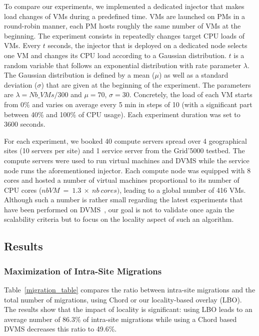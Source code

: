 To compare our experiments, we implemented a dedicated injector that makes load changes of
VMs during a predefined time. VMs are launched on PMs in a round-robin manner, \ie each
PM hosts roughly the same number of VMs at the beginning. The experiment consists in
repeatedly changes target CPU loads of VMs. Every $t$ seconds, the injector that is
deployed on a dedicated node selects one VM and changes its CPU load according to a
Gaussian distribution. $t$ is a random variable that follows an exponential distribution
with rate parameter $\lambda$. The Gaussian distribution is defined by a mean ($\mu$) as
well as a standard deviation ($\sigma$) that are given at the beginning of the experiment.
The parameters are $\lambda=\mathit{Nb\_VMs}/300$ and $\mu=70$, $\sigma=30$.
Concretely, the load of each VM starts from 0\% and varies on average every 5
min in steps of 10 (with a significant part between 40\% and 100\% of CPU
usage). Each experiment duration was set to 3600 seconds.

For each experiment, we booked 40 compute servers spread over 4 geographical sites (10
servers per site) and 1 service server from the Grid'5000 testbed. The compute servers
were used to run virtual machines and DVMS while the service node runs the aforementioned
injector.
%
Each compute node was equipped with 8 cores and hosted a number of virtual machines
proportional to its number of CPU cores ($nb VM\ =\ 1.3\ \times\ nb\ cores)$, leading to
a global number of 416 VMs. Although such a number is rather small regarding the latest
experiments that have been performed on DVMS~\cite{quesnel:ispa2013}, our goal is not to
validate once again the scalability criteria but to focus on the locality aspect of such
an algorithm.

\subsection{Results}

\subsubsection{Maximization of Intra-Site Migrations}

Table~\ref{migration_table} compares the ratio between intra-site migrations and the total
number of migrations, using Chord or our locality-based overlay (LBO). The results show that the impact of locality
is significant: using LBO leads to an average number of 86.3\%
of intra-site migrations while using a Chord based DVMS decreases this ratio to 49.6\%.

